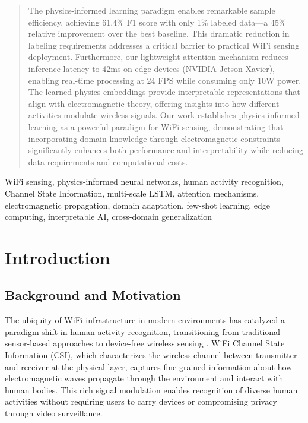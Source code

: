 \documentclass[10pt,journal,compsoc]{IEEEtran}
\begin{document}
\begin{abstract}
The physics-informed learning paradigm enables remarkable sample efficiency, achieving 61.4\% F1 score with only 1\% labeled data—a 45\% relative improvement over the best baseline. This dramatic reduction in labeling requirements addresses a critical barrier to practical WiFi sensing deployment. Furthermore, our lightweight attention mechanism reduces inference latency to 42ms on edge devices (NVIDIA Jetson Xavier), enabling real-time processing at 24 FPS while consuming only 10W power. The learned physics embeddings provide interpretable representations that align with electromagnetic theory, offering insights into how different activities modulate wireless signals. Our work establishes physics-informed learning as a powerful paradigm for WiFi sensing, demonstrating that incorporating domain knowledge through electromagnetic constraints significantly enhances both performance and interpretability while reducing data requirements and computational costs.
\end{abstract}

\begin{IEEEkeywords}
WiFi sensing, physics-informed neural networks, human activity recognition, Channel State Information, multi-scale LSTM, attention mechanisms, electromagnetic propagation, domain adaptation, few-shot learning, edge computing, interpretable AI, cross-domain generalization
\end{IEEEkeywords}

\section{Introduction}
\label{sec:introduction}

\subsection{Background and Motivation}

The ubiquity of WiFi infrastructure in modern environments has catalyzed a paradigm shift in human activity recognition, transitioning from traditional sensor-based approaches to device-free wireless sensing \cite{yang2023sensefi, wang2019device}. WiFi Channel State Information (CSI), which characterizes the wireless channel between transmitter and receiver at the physical layer, captures fine-grained information about how electromagnetic waves propagate through the environment and interact with human bodies. This rich signal modulation enables recognition of diverse human activities without requiring users to carry devices or compromising privacy through video surveillance.
\end{document}
